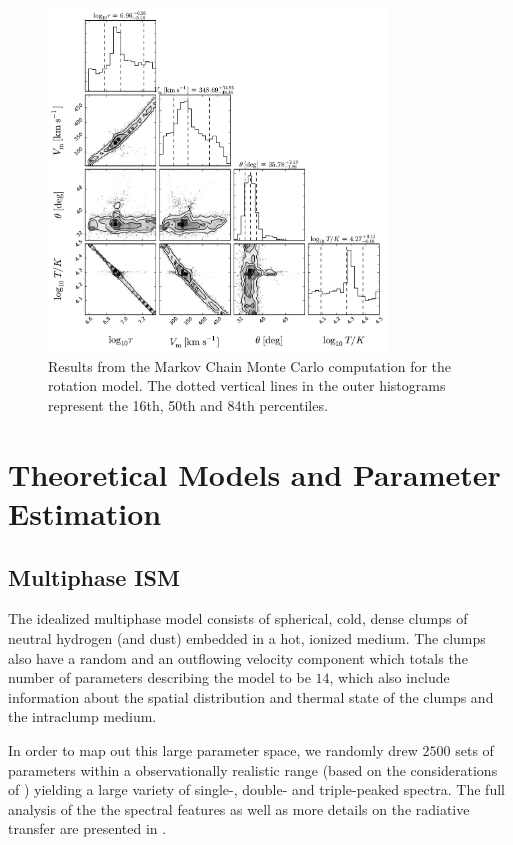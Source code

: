 \documentclass[a4,useAMS,usenatbib,usegraphicx]{mn2e}
\begin{document}
\begin{figure}
\begin{center}
\includegraphics[width=0.8\textwidth]{emcee_results.pdf}
\caption{Results from the Markov Chain Monte Carlo computation for
    the rotation model. The dotted vertical lines in the outer histograms 
	represent the 16th, 50th and 84th percentiles. \label{emceeresults}} 
\end{center}
\end{figure}


\section{Theoretical Models and Parameter Estimation}


\subsection{Multiphase ISM} 

The idealized multiphase model consists of spherical, cold, dense
clumps of neutral hydrogen (and dust) embedded in a hot, ionized
medium. 
The clumps also have a random and an outflowing velocity
component which totals the number of parameters describing the model
to be $14$, which also include information about the spatial
distribution and thermal state of the clumps and the intraclump
medium. 

In order to map out this large parameter space, we randomly drew
$2500$ sets of parameters within a observationally realistic range
(based on the considerations of \cite{Laursen2013ApJ...766..124L})
yielding a large variety of single-, double- and triple-peaked
spectra. 
The full analysis of the the spectral features as well as
more details on the radiative transfer are presented in
\citep{Gronke2016}.    
\end{document}
